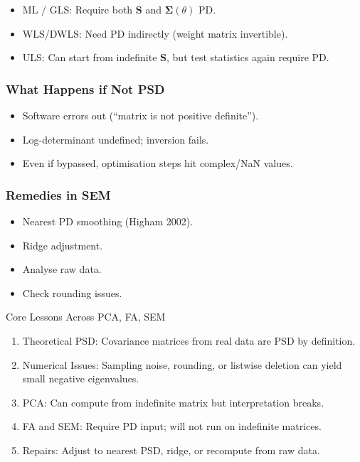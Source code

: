 \documentclass[
  12pt,
]{article}
\providecommand{\tightlist}{%
  \setlength{\itemsep}{0pt}\setlength{\parskip}{0pt}}
\theoremstyle{plain}
\theoremstyle{definition}
\theoremstyle{remark}
\begin{document}
\begin{itemize}
\tightlist
\item
  ML / GLS: Require both \(\mathbf{S}\) and
  \(\boldsymbol\Sigma(\theta)\) PD.
\item
  WLS/DWLS: Need PD indirectly (weight matrix invertible).
\item
  ULS: Can start from indefinite \(\mathbf{S}\), but test statistics
  again require PD.
\end{itemize}

\subsubsection{What Happens if Not PSD}\label{what-happens-if-not-psd}

\begin{itemize}
\tightlist
\item
  Software errors out (``matrix is not positive definite'').
\item
  Log-determinant undefined; inversion fails.
\item
  Even if bypassed, optimisation steps hit complex/NaN values.
\end{itemize}

\subsubsection{Remedies in SEM}\label{remedies-in-sem}

\begin{itemize}
\tightlist
\item
  Nearest PD smoothing (Higham 2002).
\item
  Ridge adjustment.
\item
  Analyse raw data.
\item
  Check rounding issues.
\end{itemize}

Core Lessons Across PCA, FA, SEM

\begin{enumerate}
\def\labelenumi{\arabic{enumi}.}
\tightlist
\item
  Theoretical PSD: Covariance matrices from real data are PSD by
  definition.
\item
  Numerical Issues: Sampling noise, rounding, or listwise deletion can
  yield small negative eigenvalues.
\item
  PCA: Can compute from indefinite matrix but interpretation breaks.
\item
  FA and SEM: Require PD input; will not run on indefinite matrices.
\item
  Repairs: Adjust to nearest PSD, ridge, or recompute from raw data.
\end{enumerate}
\end{document}
